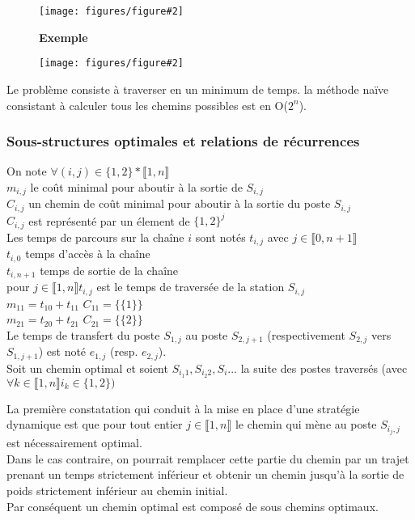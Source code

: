 \documentclass{article}
\newcommand{\schem}[3]
{
	\begin{figure}[ht]
		\centering
		\textbf{#1}\par\medskip
		\texttt{[image: figures/figure\#2]}
		\caption{}
	\end{figure}
}
\begin{document}
								\schem{}{12}{0.5}
								
								\schem{Exemple}{11}{1}
								
								Le problème consiste à traverser en un minimum de temps. la méthode naïve consistant à calculer tous les chemins possibles est en O($2^n$).
								
								\subsubsection{Sous-structures optimales et relations de récurrences}
								
									On note $\forall(i, j) \in \{1, 2\} * \llbracket 1, n\rrbracket$\\
									$m_{i,j}$ le coût minimal pour aboutir à la sortie de $S_{i,j}$\\
									$C_{i,j}$ un chemin de coût minimal pour aboutir à la sortie du poste $S_{i,j}$\\
									$C_{i,j}$ est représenté par un élement de $\{1, 2\}^j$\\
									Les temps de parcours sur la chaîne $i$ sont notés $t_{i,j}$ avec $j \in \llbracket 0, n + 1 \rrbracket$\\
									$t_{i,0}$ temps d'accès à la chaîne\\
									$t_{i,n + 1}$ temps de sortie de la chaîne\\
									pour $j \in \llbracket 1, n \rrbracket t_{i,j}$ est le temps de traversée de la station $S_{i,j}$\\
									$m_{11} = t_{10} + t_{11}$ $C_{11} = \{\{1\}\}$\\
									$m_{21} = t_{20} + t_{21}$ $C_{21} = \{\{2\}\}$\\
									Le temps de transfert du poste $S_{1,j}$ au poste $S_{2,j+1}$ (respectivement $S_{2,j}$ vers $S_{1,j+1}$) est noté $e_{1,j}$ (resp. $e_{2,j}$).\\
									Soit un chemin optimal et soient $S_{i_1 1}, S_{i_2 2}, S_i ...$ la suite des postes traversés (avec $\forall k \in \llbracket 1, n \rrbracket i_k \in \{1, 2\})$
									
									La première constatation qui conduit à la mise en place d'une stratégie dynamique est que pour tout entier $j \in \llbracket 1, n \rrbracket$ le chemin qui mène au poste $S_{i_j,j}$ est nécessairement optimal.\\
									Dans le cas contraire, on pourrait remplacer cette partie du chemin par un trajet prenant un temps strictement inférieur et obtenir un chemin jusqu'à la sortie de poids strictement inférieur au chemin initial.\\
									Par conséquent un chemin optimal est composé de sous chemins optimaux.
									
\end{document}

